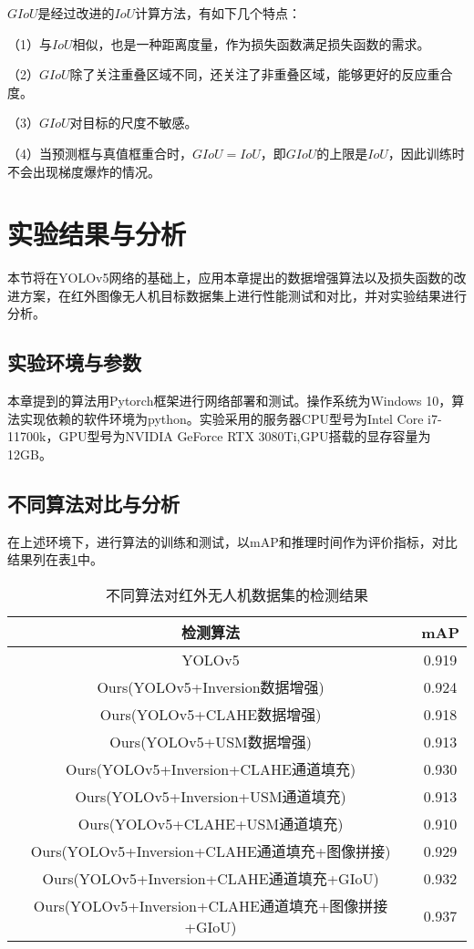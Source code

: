 $GIoU$是经过改进的$IoU$计算方法，有如下几个特点：

（1）与$IoU$相似，也是一种距离度量，作为损失函数满足损失函数的需求。

（2）$GIoU$除了关注重叠区域不同，还关注了非重叠区域，能够更好的反应重合度。

（3）$GIoU$对目标的尺度不敏感。

（4）当预测框与真值框重合时，$GIoU=IoU$，即$GIoU$的上限是$IoU$，因此训练时不会出现梯度爆炸的情况。

\section{实验结果与分析}
本节将在YOLOv5网络的基础上，应用本章提出的数据增强算法以及损失函数的改进方案，在红外图像无人机目标数据集上进行性能测试和对比，并对实验结果进行分析。


\subsection{实验环境与参数}
本章提到的算法用Pytorch框架进行网络部署和测试。操作系统为Windows 10，算法实现依赖的软件环境为python。实验采用的服务器CPU型号为Intel Core i7-11700k，GPU型号为NVIDIA GeForce RTX 3080Ti,GPU搭载的显存容量为12GB。

\subsection{不同算法对比与分析}
在上述环境下，进行算法的训练和测试，以mAP和推理时间作为评价指标，对比结果列在表\ref{m1}中。

\begin{table}[htbp]
  \caption{不同算法对红外无人机数据集的检测结果}
  \vspace{0.5em}\centering\wuhao
  \begin{tabular}{cc}
  \toprule
  检测算法 & mAP\\
  \midrule
  YOLOv5 & 0.919\\
  Ours(YOLOv5+Inversion数据增强) & 0.924\\
  Ours(YOLOv5+CLAHE数据增强) & 0.918\\
  Ours(YOLOv5+USM数据增强) & 0.913\\
  Ours(YOLOv5+Inversion+CLAHE通道填充) & 0.930\\
  Ours(YOLOv5+Inversion+USM通道填充) & 0.913\\
  Ours(YOLOv5+CLAHE+USM通道填充) & 0.910\\
  Ours(YOLOv5+Inversion+CLAHE通道填充+图像拼接) & 0.929\\
  Ours(YOLOv5+Inversion+CLAHE通道填充+GIoU) & 0.932\\
  Ours(YOLOv5+Inversion+CLAHE通道填充+图像拼接+GIoU) & 0.937\\
  \bottomrule
  \end{tabular}
  \label{m1}
\end{table}

